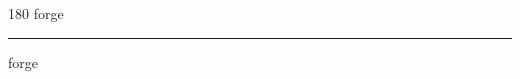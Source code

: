 
\begin{frame}
\begin{center}
\begin{turn}{180}
{\fontsize{2.5cm}{1em}\selectfont forge}
\end{turn}
\vspace{1em}\par  
\hrule
\vspace{1em}\par  
{\fontsize{2.5cm}{1em}\selectfont forge}
\end{center}
\end{frame}
